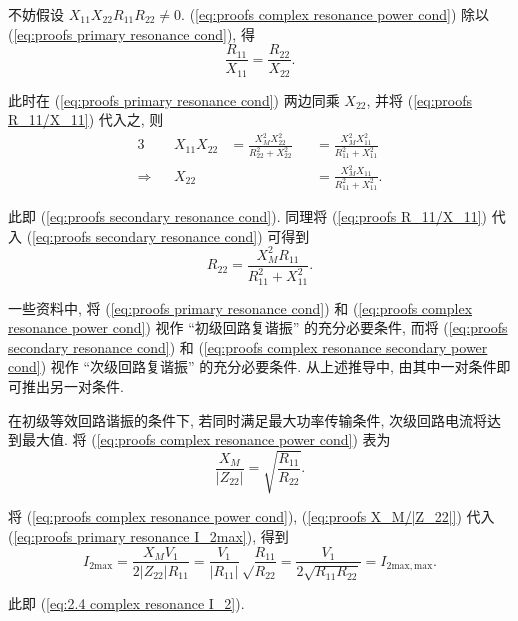 不妨假设 $X_{11}X_{22}R_{11}R_{22}\neq 0$. (\ref{eq:proofs complex resonance power cond}) 除以 (\ref{eq:proofs primary resonance cond}), 得
\begin{equation} \label{eq:proofs R_11/X_11}
    \frac{R_{11}}{X_{11}}=\frac{R_{22}}{X_{22}}.
\end{equation}

此时在 (\ref{eq:proofs primary resonance cond}) 两边同乘 $X_{22}$, 并将 (\ref{eq:proofs R_11/X_11}) 代入之, 则
\begin{alignat*}{3}
                &  & X_{11}X_{22} & =\frac{X_M^2X_{22}^2}{R_{22}^2+X_{22}^2} &  & =\frac{X_M^2X_{11}^2}{R_{11}^2+X_{11}^2} \\
    \Rightarrow &  & X_{22}       &                                          &  & =\frac{X_M^2X_{11}}{R_{11}^2+X_{11}^2}.
\end{alignat*}

\noindent 此即 (\ref{eq:proofs secondary resonance cond}). 同理将 (\ref{eq:proofs R_11/X_11}) 代入 (\ref{eq:proofs secondary resonance cond}) 可得到
\begin{equation} \label{eq:proofs complex resonance secondary power cond}
    R_{22}=\frac{X_M^2R_{11}}{R_{11}^2+X_{11}^2}.
\end{equation}

一些资料中, 将 (\ref{eq:proofs primary resonance cond}) 和 (\ref{eq:proofs complex resonance power cond}) 视作 ``初级回路复谐振'' 的充分必要条件, 而将 (\ref{eq:proofs secondary resonance cond}) 和 (\ref{eq:proofs complex resonance secondary power cond}) 视作 ``次级回路复谐振'' 的充分必要条件. 从上述推导中, 由其中一对条件即可推出另一对条件.

在初级等效回路谐振的条件下, 若同时满足最大功率传输条件, 次级回路电流将达到最大值. 将 (\ref{eq:proofs complex resonance power cond}) 表为
\begin{equation} \label{eq:proofs X_M/|Z_22|}
    \frac{X_M}{|Z_{22}|}=\sqrt{\dfrac{R_{11}}{R_{22}}}.
\end{equation}

将 (\ref{eq:proofs complex resonance power cond}), (\ref{eq:proofs X_M/|Z_22|}) 代入 (\ref{eq:proofs primary resonance I_2max}), 得到
\begin{equation}
    I_{2\mathrm{max}}=\frac{X_MV_1}{2|Z_{22}|R_{11}}=\frac{V_1}{|R_{11}|}\sqrt\dfrac{R_{11}}{R_{22}}=\frac{V_1}{2\sqrt{R_{11}R_{22}}}=I_{2\mathrm{max,max}}.
\end{equation}

\noindent 此即 (\ref{eq:2.4 complex resonance I_2}).


